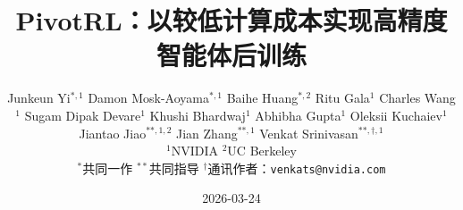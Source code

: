 \documentclass[11pt, logo, onecolumn, copyright, colorlinks=true, allcolors=blue]{nvidiatechreport}
\title{PivotRL：以较低计算成本实现高精度智能体后训练}
\author{
Junkeun Yi$^{*, 1}$\quad
Damon Mosk-Aoyama$^{*, 1}$\quad
Baihe Huang$^{*, 2}$\quad
Ritu Gala$^{1}$\quad
Charles Wang$^{1}$\quad
Sugam Dipak Devare$^{1}$\quad
Khushi Bhardwaj$^{1}$\quad
Abhibha Gupta$^{1}$\quad
Oleksii Kuchaiev$^{1}$\quad
Jiantao Jiao$^{**,1,2}$\quad
Jian Zhang$^{**,1}$\quad
Venkat Srinivasan$^{**,\dagger,1}$
\vspace{6pt}

{\footnotesize\textnormal{$^{1}$NVIDIA\quad
$^{2}$UC Berkeley}}

{\footnotesize\textnormal{$^{*}$共同一作\quad
$^{**}$共同指导\quad
$^{\dagger}$通讯作者：\texttt{venkats@nvidia.com}}}
}
\date{2026-03-24}
\theoremstyle{plain}
\theoremstyle{definition}
\begin{document}

\maketitle










\newpage
\appendix
\onecolumn



\end{document}
